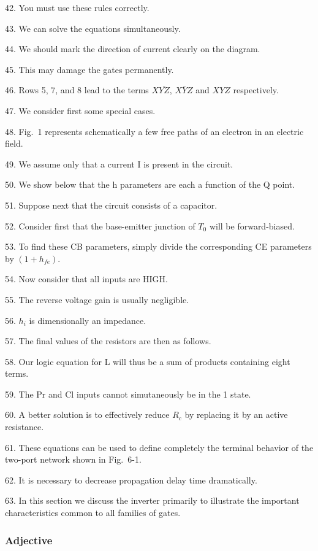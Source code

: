 \documentclass[a4paper,twocolumn,10pt]{article}
\begin{document}
\begin{CJK}{UTF8}{gkai}
	42. You must use these rules correctly.

	43. We can solve the equations simultaneously.

	44. We should mark the direction of current clearly on the diagram.

	45. This may damage the gates permanently.

	46. Rows 5, 7, and 8 lead to the terms $X\bar{YZ}$, $X\bar{Y}Z$ and $XYZ$ respectively.

	47. We consider first some special cases.

	48. Fig.~1 represents schematically a few free paths of an electron in an electric field.

	49. We assume only that a current I is present in the circuit.

	50. We show below that the h parameters are each a function of the Q point.

	51. Suppose next that the circuit consists of a capacitor.

	52. Consider first that the base-emitter junction of $T_0$ will be forward-biased.

	53. To find these CB parameters, simply divide the corresponding CE parameters by 
	$(1+h_{fe})$.

	54. Now consider that all inputs are HIGH.

	55. The reverse voltage gain is usually negligible.

	56. $h_i$ is dimensionally an impedance.

	57. The final values of the resistors are then as follows.

	58. Our logic equation for L will thus be a sum of products containing eight terms.

	59. The Pr and Cl inputs cannot simutaneously be in the 1 state.

	60. A better solution is to effectively reduce $R_c$ by replacing it by an active resistance.

	61. These equations can be used to define completely the terminal behavior of the two-port network
	shown in Fig.~6-1.

	62. It is necessary to decrease propagation delay time dramatically.

	63. In this section we discuss the inverter primarily to illustrate the important characteristics
	common to all families of gates.

	\subsubsection{Adjective}


\end{CJK}
\end{document}
